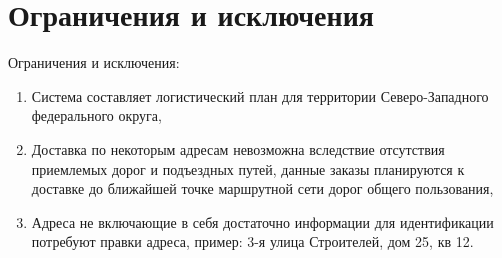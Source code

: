 \section{Ограничения и исключения}
\label{sec:limit}

Ограничения и исключения:
\begin{enumerate}[label=LMT-\arabic*]
    \item Система составляет логистический план для территории Северо-Западного федерального округа,
    \item Доставка по некоторым адресам невозможна вследствие отсутствия приемлемых дорог и подъездных путей, данные заказы планируются к доставке до ближайшей точке маршрутной сети дорог общего пользования,
    \item Адреса не включающие в себя достаточно информации для идентификации потребуют правки адреса, пример: 3-я улица Строителей, дом 25, кв 12.
\end{enumerate}

\endinput
